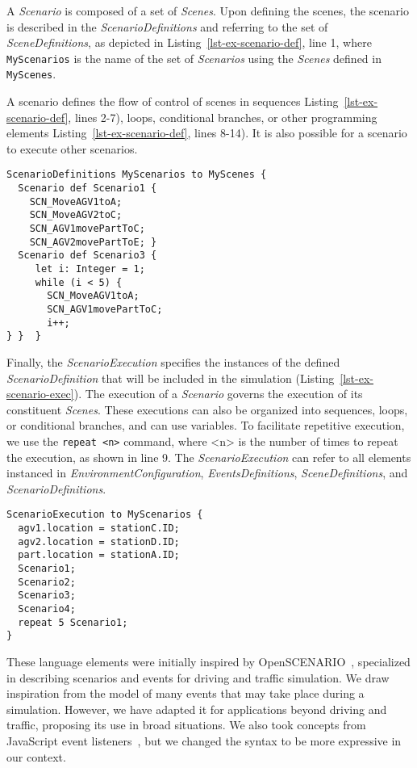 A \textit{Scenario} is composed of a set of \textit{Scenes}. Upon defining the scenes, the scenario is described in the \textit{ScenarioDefinitions} and referring to the set of \textit{SceneDefinitions}, as depicted in Listing~\ref{lst-ex-scenario-def}, line 1, where  \texttt{MyScenarios} is the name of the set of \textit{Scenarios} using the \textit{Scenes} defined in \texttt{MyScenes}. 

A scenario defines the flow of control of scenes in sequences Listing~\ref{lst-ex-scenario-def}, lines 2-7), loops, conditional branches, or other programming elements Listing~\ref{lst-ex-scenario-def}, lines 8-14). It is also possible for a scenario to execute other scenarios. 

\begin{lstlisting}[caption=Example of ScenarioDefinitions elements declarations, label={lst-ex-scenario-def}]
ScenarioDefinitions MyScenarios to MyScenes {
  Scenario def Scenario1 { 
    SCN_MoveAGV1toA;
    SCN_MoveAGV2toC;
    SCN_AGV1movePartToC;
    SCN_AGV2movePartToE; }
  Scenario def Scenario3 { 
     let i: Integer = 1;
     while (i < 5) {
       SCN_MoveAGV1toA;
       SCN_AGV1movePartToC;
       i++;
} }  }
\end{lstlisting}

Finally, the \textit{ScenarioExecution} specifies the instances of the defined \textit{ScenarioDefinition} that will be included in the simulation (Listing~\ref{lst-ex-scenario-exec}). The execution of a \textit{Scenario} governs the execution of its constituent \textit{Scenes}. These executions can also be organized into sequences, loops, or conditional branches, and can use variables. To facilitate repetitive execution, we use the \texttt{repeat <n>} command, where <n> is the number of times to repeat the execution, as shown in line 9. The \textit{ScenarioExecution} can refer to all elements instanced in \textit{EnvironmentConfiguration}, \textit{EventsDefinitions}, \textit{SceneDefinitions}, and \textit{ScenarioDefinitions}. 

\begin{lstlisting}[caption=Example of ScenarioExecution elements declarations, label={lst-ex-scenario-exec}]
ScenarioExecution to MyScenarios {
  agv1.location = stationC.ID;
  agv2.location = stationD.ID;
  part.location = stationA.ID; 
  Scenario1;
  Scenario2;
  Scenario3;
  Scenario4;
  repeat 5 Scenario1; 
} 
\end{lstlisting}

These language elements were initially inspired by OpenSCENARIO~\cite{ASAMOpenSCENARIO}, specialized in describing scenarios and events for driving and traffic simulation. We draw inspiration from the model of many events that may take place during a simulation. However, we have adapted it for applications beyond driving and traffic, proposing its use in broad situations. We also took concepts from JavaScript event listeners~\cite{ecma262-2024}, but we changed the syntax to be more expressive in our context.